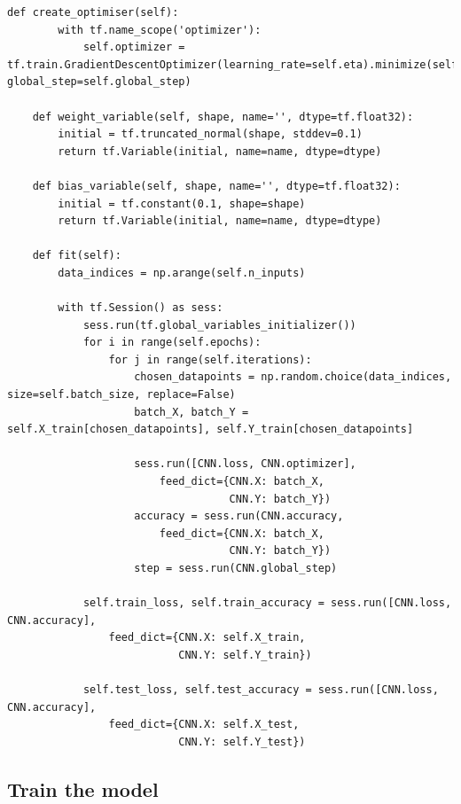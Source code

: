 \documentclass[%
oneside,                 %
final,                   %
10pt]{article}
\begin{document}
\begin{Verbatim}[numbers=none,fontsize=\fontsize{9pt}{9pt},baselinestretch=0.95]
    def create_optimiser(self):
        with tf.name_scope('optimizer'):
            self.optimizer = tf.train.GradientDescentOptimizer(learning_rate=self.eta).minimize(self.loss, global_step=self.global_step)
            
    def weight_variable(self, shape, name='', dtype=tf.float32):
        initial = tf.truncated_normal(shape, stddev=0.1)
        return tf.Variable(initial, name=name, dtype=dtype)
    
    def bias_variable(self, shape, name='', dtype=tf.float32):
        initial = tf.constant(0.1, shape=shape)
        return tf.Variable(initial, name=name, dtype=dtype)

    def fit(self):
        data_indices = np.arange(self.n_inputs)

        with tf.Session() as sess:
            sess.run(tf.global_variables_initializer())
            for i in range(self.epochs):
                for j in range(self.iterations):
                    chosen_datapoints = np.random.choice(data_indices, size=self.batch_size, replace=False)
                    batch_X, batch_Y = self.X_train[chosen_datapoints], self.Y_train[chosen_datapoints]
            
                    sess.run([CNN.loss, CNN.optimizer],
                        feed_dict={CNN.X: batch_X,
                                   CNN.Y: batch_Y})
                    accuracy = sess.run(CNN.accuracy,
                        feed_dict={CNN.X: batch_X,
                                   CNN.Y: batch_Y})
                    step = sess.run(CNN.global_step)
    
            self.train_loss, self.train_accuracy = sess.run([CNN.loss, CNN.accuracy],
                feed_dict={CNN.X: self.X_train,
                           CNN.Y: self.Y_train})
        
            self.test_loss, self.test_accuracy = sess.run([CNN.loss, CNN.accuracy],
                feed_dict={CNN.X: self.X_test,
                           CNN.Y: self.Y_test})
\end{Verbatim}

\subsection*{Train the model}
\end{document}

